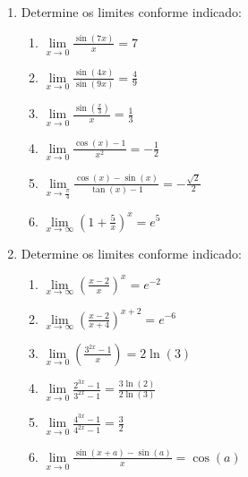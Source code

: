 \documentclass[oneside,a4paper,12pt]{article}
\begin{document}
\begin{enumerate}
	\item Determine os limites conforme indicado:
	\begin{multicols}{2}
		\begin{enumerate}
			\item $\lim\limits_{x\rightarrow 0}\frac{\sin(7x)}{x} = 7$
			\item $\lim\limits_{x\rightarrow 0}\frac{\sin(4x)}{\sin(9x)} = \frac{4}{9}$
			\item $\lim\limits_{x\rightarrow 0}\frac{\sin(\frac{x}{3})}{x} = \frac{1}{3}$
			\item $\lim\limits_{x\rightarrow 0}\frac{\cos(x) - 1}{x^2} = - \frac{1}{2}$
			\item $\lim\limits_{x\rightarrow \frac{\pi}{4}}\frac{\cos(x) - \sin(x)}{\tan(x)-1} = - \frac{\sqrt{2}}{2}$
			\item $\lim\limits_{x\rightarrow  \infty}\left( 1 + \frac{5}{x} \right)^{x} = e^5$
		\end{enumerate}
	\end{multicols}


	\item Determine os limites conforme indicado:
	\begin{multicols}{2}
		\begin{enumerate}
			\item $\lim\limits_{x\rightarrow  \infty}\left( \frac{x - 2}{x} \right)^{x} = e^{-2}$
			\item $\lim\limits_{x\rightarrow  \infty}\left( \frac{x - 2}{x + 4} \right)^{x + 2} = e^{-6}$
			\item $\lim\limits_{x\rightarrow 0}\left( \frac{3^{2x}-1}{x} \right) = 2\ln(3)$
			\item $\lim\limits_{x\rightarrow 0}\frac{2^{3x}-1}{3^{2x}-1} = \frac{3 \ln(2)}{2 \ln(3)}$
			\item $\lim\limits_{x\rightarrow 0}\frac{4^{3x}-1}{4^{2x}-1} = \frac{3}{2}$
			\item $\lim\limits_{x\rightarrow 0}\frac{\sin(x + a) - \sin(a)}{x} = \cos(a)$
		\end{enumerate}
	\end{multicols}


\end{enumerate}
\end{document}
